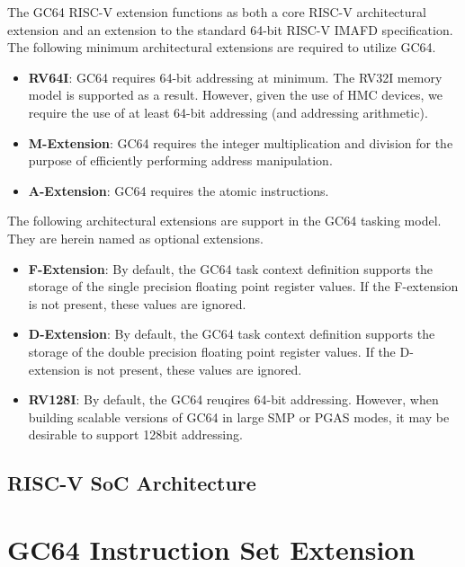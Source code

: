 \documentclass{article}
\begin{document}
The GC64 RISC-V extension functions as both a core RISC-V \cite{Waterman:EECS-2014-54} architectural extension and an extension to the standard 64-bit RISC-V IMAFD specification.  The following minimum architectural extensions are required to utilize GC64.  

\begin{itemize}
\item \textbf{RV64I}:  GC64 requires 64-bit addressing at minimum.  The RV32I memory model is supported as a result.  However, given the use of HMC devices, we require the use of at least 64-bit addressing (and addressing arithmetic).  
\item \textbf{M-Extension}:  GC64 requires the integer multiplication and division for the purpose of efficiently performing address manipulation.  
\item \textbf{A-Extension}: GC64 requires the atomic instructions.
\end{itemize}

The following architectural extensions are support in the GC64 tasking model.  They are herein named as optional extensions.  

\begin{itemize}
\item \textbf{F-Extension}:  By default, the GC64 task context definition supports the storage of the single precision floating point register values.  If the F-extension is not present, these values are ignored.  
\item \textbf{D-Extension}: By default, the GC64 task context definition supports the storage of the double precision floating point register values.  If the D-extension is not present, these values are ignored.  
\item \textbf{RV128I}: By default, the GC64 reuqires 64-bit addressing.  However, when building scalable versions of GC64 in large SMP or PGAS modes, it may be desirable to support 128bit addressing.  
\end{itemize}

\subsection{RISC-V SoC Architecture}

\section{GC64 Instruction Set Extension}
\end{document}
